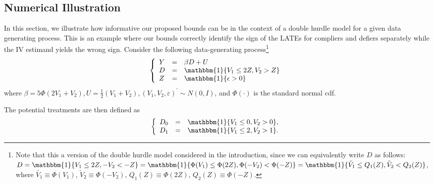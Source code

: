 \documentclass[12pt]{article}
\theoremstyle{plain}
\theoremstyle{definition}
\theoremstyle{remark}
\begin{document}
\subsection{Numerical Illustration}\label{simu}
In this section, we illustrate how informative our proposed bounds can be in the context of a double hurdle model for a given data generating process. This is an example where our bounds correctly identify the sign of the LATEs for compliers and defiers separately while the IV estimand yields the wrong sign. Consider the following data-generating process\footnote{Note that this a version of the double hurdle model considered in the introduction, since we can equivalently write $D$ as follows:\\ $D = \mathbbm{1}\{V_1\leq 2 Z, -V_2< -Z\}=\mathbbm{1}\{\Phi(V_1)\leq \Phi(2 Z), \Phi(-V_2) < \Phi(-Z)\}=\mathbbm{1}\{\tilde{V}_1\leq Q_1(Z), \tilde{V}_2 < Q_2(Z)\}$, where $\tilde{V_1}\equiv \Phi(V_1)$, $\tilde{V}_2\equiv \Phi(-V_2)$, $Q_1(Z)\equiv \Phi(2Z)$, $Q_2(Z) \equiv \Phi(-Z)$.}
\begin{equation*}
    \left\{\begin{array}{lll}
Y&= &\beta D+U \\
D&= &\mathbbm{1}\{V_1\leq 2 Z, V_2> Z\} \\
Z&= &\mathbbm{1}\{\epsilon>0\}
\end{array}\right.
\end{equation*}
where $\beta=5 \Phi(2V_1+V_2), U=\frac{1}{2} (V_1+V_2), (V_1, V_2, \varepsilon)^{\prime} \sim N(0, I)$, and $\Phi(\cdot)$ is the standard normal cdf.

The potential treatments are then defined as
\begin{equation*}
    \left\{\begin{array}{lll}
D_0&= &\mathbbm{1}\{V_1 \leq 0, V_2>0\}, \\
D_1&= &\mathbbm{1}\{V_1 \leq 2, V_2>1\}. 
\end{array}\right.
\end{equation*}
\end{document}
